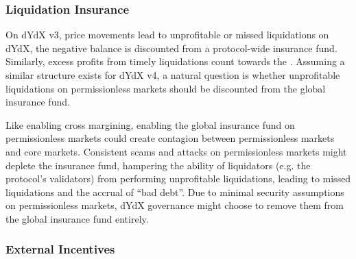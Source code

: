         \subsubsection{Liquidation Insurance}
        
            On dYdX v3, price movements lead to unprofitable or missed liquidations on dYdX, the negative balance is discounted from a protocol-wide insurance fund. Similarly, excess profits from timely liquidations count towards the . Assuming a similar structure exists for dYdX v4, a natural question is whether unprofitable liquidations on permissionless markets should be discounted from the global insurance fund.

            Like enabling cross margining, enabling the global insurance fund on permissionless markets could create contagion between permissionless markets and core markets. Consistent scams and attacks on permissionless markets might deplete the insurance fund, hampering the ability of liquidators (e.g. the protocol's validators) from performing unprofitable liquidations, leading to missed liquidations and the accrual of ``bad debt''. Due to minimal security assumptions on permissionless markets, dYdX governance might choose to remove them from the global insurance fund entirely.
            
        \subsubsection{External Incentives}


